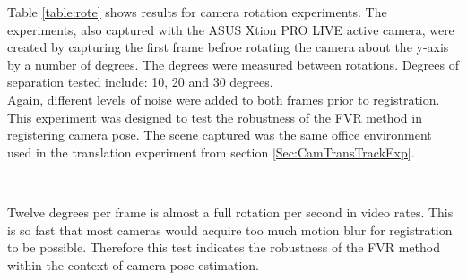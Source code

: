 Table \ref{table:rote} shows results for camera rotation experiments. The experiments, also captured with the ASUS Xtion PRO LIVE active camera, were created by capturing the first frame befroe rotating the camera about the y-axis by a number of degrees. The degrees were measured between rotations. Degrees of separation tested include: 10, 20 and 30 degrees. \\

Again, different levels of noise were added to both frames prior to registration. This experiment was designed to test the robustness of the FVR method in registering camera pose. The scene captured was the same office environment used in the translation experiment from section \ref{Sec:CamTransTrackExp}. \\

\begin{table}[!htb]
\centering
{}
\\
\caption{Rotation Tracking}
\label{table:rote}
\end{table}

Twelve degrees per frame is almost a full rotation per second in video rates. This is so fast that most cameras would acquire too much motion blur for registration to be possible. Therefore this test indicates the robustness of the FVR method within the context of camera pose estimation. \\

